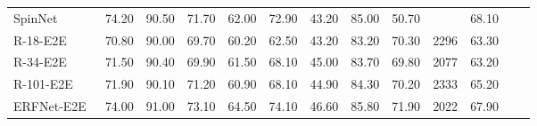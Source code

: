 \documentclass[final]{cvpr}
\begin{document}
\begin{table*}
\begin{center}
{\begin{tabular}{@{}lrrrrrrrrrrrr@{}}
                SpinNet~\cite{spinnet}              & 74.20                             & 90.50                              & 71.70                               & 62.00                                    & 72.90                              & 43.20                               & 85.00                             & 50.70                             &                                    & 68.10                             &                                  &                                   \\


                R-18-E2E~\cite{e2e-lmd}              & 70.80                             & 90.00                              & 69.70                               & 60.20                                    & 62.50                              & 43.20                               & 83.20                             & 70.30                             & 2296                               & 63.30                             &                                  &                                   \\

                R-34-E2E~\cite{e2e-lmd}              & 71.50                             & 90.40                              & 69.90                               & 61.50                                    & 68.10                              & 45.00                               & 83.70                             & 69.80                             & 2077                               & 63.20                             &                                  &                                   \\

                R-101-E2E~\cite{e2e-lmd}              & 71.90                             & 90.10                              & 71.20                               & 60.90                                    & 68.10                              & 44.90                               & 84.30                             & 70.20                             & 2333                               & 65.20                             &                                  &                                   \\

                ERFNet-E2E~\cite{e2e-lmd}              & 74.00                             & 91.00                              & 73.10                               & 64.50                                    & 74.10                              & 46.60                               & 85.80                             & 71.90                             & 2022                               & 67.90                             &                                  &                                   \\ \midrule


\end{tabular}}
\end{center}
\end{table*}
\end{document}
